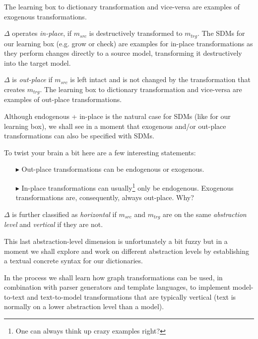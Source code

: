 The learning box to dictionary transformation and vice-versa are examples of exogenous transformations.

$\Delta$ operates \emph{in-place}, if $m_{src}$ is destructively transformed to $m_{trg}$.
The SDMs for our learning box (e.g. grow or check) are examples for in-place transformations as they perform changes directly to a source model, transforming it destructively into the target model.


$\Delta$ is \emph{out-place} if $m_{src}$ is left intact and is not changed by the transformation that creates $m_{trg}$.
The learning box to dictionary transformation and vice-versa are examples of out-place transformations.

Although endogenous + in-place is the natural case for SDMs (like for our learning box), we shall see in a moment that exogenous and/or out-place transformations can also be specified with SDMs.

 
To twist your brain a bit here are a few interesting statements:
\begin{enumerate}
\item[$\blacktriangleright$] Out-place transformations can be endogenous or exogenous.

\item[$\blacktriangleright$] In-place transformations can usually\footnote{One can always think up crazy examples right?} only be endogenous.  Exogenous transformations are, consequently, always out-place.  Why? 
\end{enumerate}  

   
$\Delta$ is further classified as \emph{horizontal} if $m_{src}$ and $m_{trg}$ are on the same \emph{abstraction level} and \emph{vertical} if they are not. 

This last abstraction-level dimension is unfortunately a bit fuzzy but in a moment we shall explore and work on 
different abstraction levels by establishing a textual concrete syntax for our dictionaries.

In the process we shall learn how graph transformations can be used, in combination with parser generators and template languages, to implement model-to-text and text-to-model transformations that are typically vertical (text is normally on a lower abstraction level than a model).  


